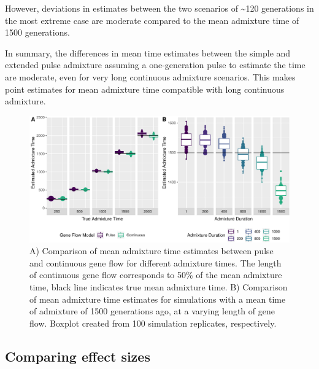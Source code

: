 \documentclass[]{article}
\begin{document}
However, deviations in
estimates between the two scenarios of \textasciitilde{}120 generations
in the most extreme case are moderate compared to the mean admixture
time of 1500 generations.

In summary, the differences in mean time estimates between the simple and extended pulse admixture assuming a one-generation pulse to estimate the time are moderate, even for very long continuous admixture scenarios. This makes point estimates for mean admixture time compatible with long continuous admixture.


\begin{figure}
\centering
\includegraphics{Admixture_Time_Inference_Paper_Draft_files/figure-latex/fig2-1.pdf}
\caption{\label{fig:fig2} A) Comparison of mean admixture time estimates
between pulse and continuous gene flow for different admixture times.
The length of continuous gene flow corresponds to 50\% of the mean
admixture time, black line indicates true mean admixture time. B)
Comparison of mean admixture time estimates for simulations with a mean
time of admixture of 1500 generations ago, at a varying length of gene
flow. Boxplot created from 100 simulation replicates, respectively.}
\end{figure}
\subsection{Comparing effect sizes}\label{comparing effect sizes}
\end{document}
